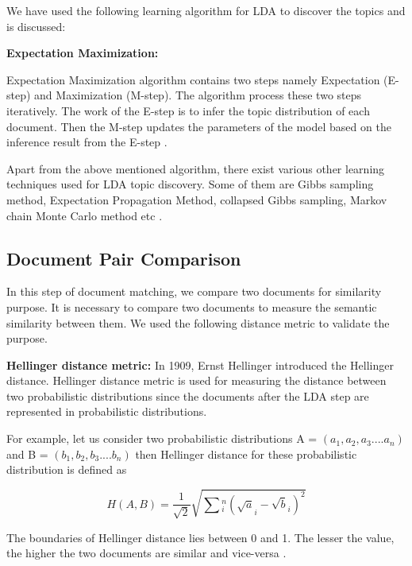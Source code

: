 \par We have used the following learning algorithm for LDA to discover the topics and is discussed:

\textbf{Expectation Maximization:} 

Expectation Maximization algorithm contains two steps namely Expectation (E-step) and Maximization (M-step). The algorithm process these two steps iteratively. The work of the E-step is to infer the topic distribution of each document. Then the M-step updates the parameters of the model based on the inference result from the E-step \cite{blei2003latent,nallapati2007parallelized}. 

\par Apart from the above mentioned algorithm, there exist various other learning techniques used for LDA topic discovery. Some of them are Gibbs sampling method, Expectation Propagation Method, collapsed Gibbs sampling, Markov chain Monte Carlo method etc \cite{minka2002expectation,griffiths2004finding}.



\subsection{Document Pair Comparison}
\label{section: document pair comparison}
In this step of document matching, we compare two documents for similarity purpose. It is necessary to compare two documents to measure the semantic similarity between them. We used the following distance metric to validate the purpose.

\textbf{Hellinger distance metric:} In 1909, Ernst Hellinger introduced the Hellinger distance. Hellinger distance metric is used for measuring the distance between two probabilistic distributions since the documents after the LDA step are represented in probabilistic distributions. 

\par For example, let us consider two probabilistic distributions A = \( (a_1, a_2, a_3....a_n)\) and B = \( (b_1, b_2, b_3....b_n)\) then Hellinger distance for these probabilistic distribution is defined as

\begin{equation}\label{formula: hellinger equation}
H(A,B) = \frac{1}{\sqrt{2}}\sqrt{\sum{}_i^n(\sqrt{a}_i - \sqrt{b}_i)^2}
\end{equation}


\par The boundaries of Hellinger distance lies between 0 and 1. The lesser the value, the higher the two documents are similar and vice-versa \cite{gibbs2002choosing} \cite{rus2013similarity}.

